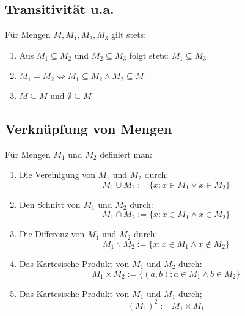 \subsection{Transitivität u.a.}
Für Mengen $M, M_1, M_2, M_3$ gilt stets:
\begin{enumerate}[label= (\alph*)]
    \item Aus $M_1 \subseteq M_2$ und $M_2 \subseteq M_3$ folgt stets:
        $M_1 \subseteq M_3$
    \item
        $M_1 = M_2 \Leftrightarrow M_1 \subseteq M_2 \land M_2 \subseteq M_1$
    \item $M \subseteq M$ und $\emptyset \subseteq M$
\end{enumerate}

\subsection{Verknüpfung von Mengen}
Für Mengen $M_1$ und $M_2$ definiert man:
\begin{enumerate}[label= (\alph*)]
    \item Die Vereinigung von $M_1$ und $M_2$ durch:
        \begin{equation*}
            M_1 \cup M_2 := \{ x: x \in M_1 \lor x \in M_2 \}
        \end{equation*}
    \item Den Schnitt von $M_1$ und $M_2$ durch:
        \begin{equation*}
            M_1 \cap M_2 := \{ x: x \in M_1 \land x \in M_2 \}
        \end{equation*}
    \item Die Differenz von  $M_1$ und $M_2$ durch:
        \begin{equation*}
            M_1 \backslash M_2 := \{ x: x \in M_1 \land x \notin M_2 \}
        \end{equation*}
    \item Das Kartesische Produkt von  $M_1$ und $M_2$ durch:
        \begin{equation*}
            M_1 \times M_2 := \{(a, b): a \in M_1 \land b \in M_2 \}
        \end{equation*}
    \item Das Kartesische Produkt von $M_1$ und $M_1$ durch;
        \begin{equation*}
            {(M_1)}^2 := M_1 \times M_1
        \end{equation*}
\end{enumerate}

